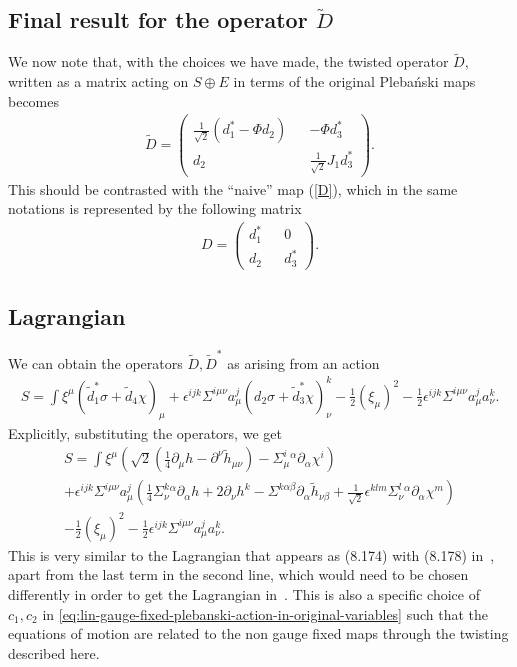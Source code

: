 \documentclass[10pt]{report}
\newcommand{\pleb}[0]{Pleba\'nski}
\theoremstyle{definition}
\begin{document}
\subsection{Final result for the operator \texorpdfstring{$\tilde{D}$}{D}}
We now note that, with the choices we have made, the twisted operator $\tilde{D}$, written as a matrix acting on $S \oplus E$ in terms of the original \pleb{} maps becomes 
\begin{align}
\tilde{D} = \begin{pmatrix}\frac{1}{\sqrt{2}}(d^*_1 - \Phi d_2) && -\Phi d^*_3 \\ d_2 && \frac{1}{\sqrt{2}} J_1 d^*_3 \end{pmatrix}.
\end{align}
This should be contrasted with the ``naive'' map (\ref{D}), which in the same notations is represented by the following matrix
\begin{align}
D = \begin{pmatrix}d^*_1 && 0 \\ d_2 &&  d^*_3 \end{pmatrix}.
\end{align}

\subsection{Lagrangian}

We can obtain the operators $\tilde{D}, \tilde{D}^*$ as arising from an action
\begin{align}
S = \int  \xi^\mu  (\tilde{d}_1^* \sigma+ \tilde{d}_4 \chi)_\mu + \epsilon^{ijk} \Sigma^{i\mu\nu} a^j_\mu( d_2\sigma+ \tilde{d}_3^* \chi)_\nu^k - \frac{1}{2} (\xi_\mu)^2 - \frac{1}{2} \epsilon^{ijk} \Sigma^{i\mu\nu} a^j_\mu a^k_\nu.
\end{align}
Explicitly, substituting the operators, we get
\begin{align}
S = \int  \xi^\mu  (\sqrt{2}( \frac{1}{4} \partial_\mu h -  \partial^\nu \tilde{h}_{\mu\nu}) - \Sigma^i_\mu{}^\alpha \partial_\alpha \chi^i) \\ \nonumber
+ \epsilon^{ijk} \Sigma^{i\mu\nu} a^j_\mu( \frac{1}{4} \Sigma^k_\nu{}^\alpha \partial_\alpha h +2 \partial_\nu h^k -  \Sigma^{k\alpha\beta} \partial_\alpha \tilde{h}_{\nu\beta} + \frac{1}{\sqrt{2}} \epsilon^{klm} \Sigma^l_\nu{}^\alpha \partial_\alpha \chi^m) \\ \nonumber
- \frac{1}{2} (\xi_\mu)^2 - \frac{1}{2} \epsilon^{ijk} \Sigma^{i\mu\nu} a^j_\mu a^k_\nu.
\end{align}
This is very similar to the Lagrangian that appears as (8.174) with (8.178) in~\cite{ChiralPerturbaKrasno2020}, apart from the last term in the second line, which would need to be chosen differently in order to get the Lagrangian in~\cite{ChiralPerturbaKrasno2020}. This is also a specific choice of $c_1,c_2$ in \cref{eq:lin-gauge-fixed-plebanski-action-in-original-variables} such that the equations of motion are related to the non gauge fixed maps through the twisting described here.
\end{document}
